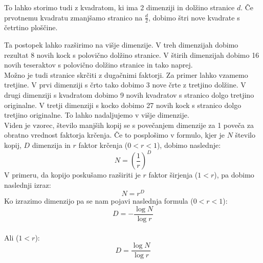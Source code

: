 \documentclass[a4paper, 12px]{article}
\begin{document}
        \addvspace{0.5cm}

        \addvspace{0.3cm}
        To lahko storimo tudi z kvadratom, ki ima 2 dimenziji in dolžino stranice $d$.
        Če prvotnemu kvadratu zmanjšamo stranico na $\frac{d}{2}$, dobimo štri nove kvadrate s četrtino ploščine.

        \addvspace{0.5cm}

        \addvspace{0.3cm}
        Ta postopek lahko razširimo na višje dimenzije.
        V treh dimenzijah dobimo rezultat 8 novih kock s polovično dolžino stranice.
        V štirih dimenzijah dobimo 16 novih teseraktov s polovično dolžino stranice in tako naprej.\\
        
        Možno je tudi stranice skrčiti z dugačnimi faktorji.
        Za primer lahko vzamemo tretjine.
        V prvi dimenziji s črto tako dobimo 3 nove črte z tretjino dolžine.
        V drugi dimenziji s kvadratom dobimo 9 novih kvadratov s stranico dolgo tretjino originalne.
        V tretji dimenziji s kocko dobimo 27 novih kock s stranico dolgo tretjino originalne.
        To lahko nadaljujemo v višje dimenzije.\\
        
        Viden je vzorec, število manjših kopij se s povečanjem dimenzije za 1 poveča za obratno vrednost faktorja krčenja.
        Če to posplošimo v formulo, kjer je $N$ število kopij, $D$ dimenzija in $r$ faktor krčenja ($0<r<1$), dobimo naslednje:
        \[N=\left(\frac{1}{r}\right)^D\]
        V primeru, da kopijo poskušamo razširiti je $r$ faktor širjenja ($1<r$), pa dobimo naslednji izraz:
        \[N=r^D\]
        Ko izrazimo dimenzijo pa se nam pojavi naslednja formula ($0<r<1$):
        \[D=-\frac{\log{N}}{\log{r}}\]\\
        Ali ($1<r$):
        \[D=\frac{\log{N}}{\log{r}}\]
\end{document}
